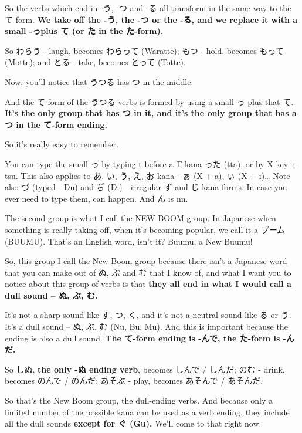 So the verbs which end in -う, -つ and -る all transform in the same way to the て-form. {\bf We take off the -う, the -つ or the -る, and we replace it with a small -っplus て (or た in the た-form).}

So わらう - laugh, becomes わらって (Waratte);\crlf
もつ - hold, becomes もって (Motte);\crlf
and とる - take, becomes とって (Totte).

Now, you'll notice that うつる has つ in the middle.

{}

And the て-form of the うつる verbs is formed by using a small っ plus that て. {\bf It's the only group that has つ in it, and it's the only group that has a つ in the て-form ending.}

So it's really easy to remember.

You can type the small っ by typing t before a T-kana った (tta), or by X key + tsu. This also applies to あ, い, う, え, お kana - ぁ (X + a), ぃ (X + i)\ldots{} Note also づ (typed - Du) and ぢ (Di) - irregular ず and じ kana forms. In case you ever need to type them, can happen. And ん is nn.

\stopsectionlevel

\startsectionlevel[title={The Second Godan Group},reference={the-second-godan-group}]

The second group is what I call the NEW BOOM group. In Japanese when something is really taking off, when it's becoming popular, we call it a ブーム (BUUMU). That's an English word, isn't it? Buumu, a New Buumu!

So, this group I call the New Boom group because there isn't a Japanese word that you can make out of ぬ, ぶ and む that I know of, and what I want you to notice about this group of verbs is that {\bf they all end in what I would call a dull sound -- ぬ, ぶ, む.}

{}

It's not a sharp sound like す, つ, く, and it's not a neutral sound like る or う. It's a dull sound -- ぬ, ぶ, む (Nu, Bu, Mu). And this is important because the ending is also a dull sound. {\bf The て-form ending is -んで, the た-form is -んだ.}

So しぬ, {\bf the only -ぬ ending verb}, becomes しんで / しんだ;\crlf
のむ - drink, becomes のんで / のんだ; あそぶ - play, becomes あそんで / あそんだ.

So that's the New Boom group, the dull-ending verbs. And because only a limited number of the possible kana can be used as a verb ending, they include all the dull sounds {\bf except for ぐ (Gu).} We'll come to that right now.

